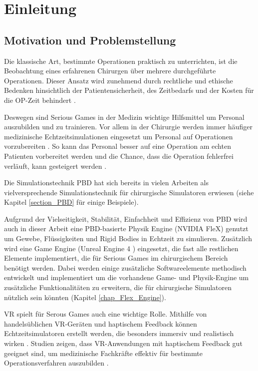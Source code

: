 \chapter{Einleitung}
\label{chap_Einleitung}



\section{Motivation und Problemstellung}


Die klassische Art, bestimmte Operationen praktisch zu unterrichten, ist die Beobachtung eines erfahrenen Chirurgen über mehrere durchgeführte Operationen. Dieser Ansatz wird zunehmend durch rechtliche und ethische Bedenken hinsichtlich der Patientensicherheit, des Zeitbedarfs und der Kosten für die OP-Zeit behindert \cite{SurgSim}.

Deswegen sind Serious Games in der Medizin wichtige Hilfsmittel um Personal auszubilden und zu trainieren. Vor allem in der Chirurgie werden immer häufiger medizinische Echtzeitsimulationen eingesetzt um Personal auf Operationen vorzubereiten \cite{SimRole}. So kann das Personal besser auf eine Operation am echten Patienten vorbereitet werden und die Chance, dass die Operation fehlerfrei verläuft, kann gesteigert werden \cite{VRNeuro}.

Die Simulationstechnik \ac{PBD} \cite{PBD} hat sich bereits in vielen Arbeiten als vielversprechende Simulationstechnik für chirurgische Simulatoren erwiesen (siehe Kapitel \ref{section_PBD} für einige Beispiele). 

Aufgrund der Vielseitigkeit, Stabilität, Einfachheit und Effizienz von PBD wird auch in dieser Arbeit eine PBD-basierte Physik Engine (NVIDIA FleX) genutzt um Gewebe, Flüssigkeiten und Rigid Bodies in Echtzeit zu simulieren. Zusätzlich wird eine Game Engine (Unreal Engine 4 \cite{UE4FlexDoc}) eingesetzt, die fast alle restlichen Elemente implementiert, die für Serious Games im chirurgischem Bereich benötigt werden. Dabei werden einige zusätzliche Softwareelemente methodisch entwickelt und implementiert um die vorhandene Game- und Physik-Engine um zusätzliche Funktionalitäten zu erweitern, die für chirurgische Simulatoren nützlich sein könnten (Kapitel \ref{chap_Flex_Engine}).

\ac{VR} spielt für Serous Games auch eine wichtige Rolle. 
Mithilfe von handelsüblichen VR-Geräten und haptischem Feedback können Echtzeitsimulatoren erstellt werden, die besonders immersiv und realistisch wirken \cite{VRSim20}. 
Studien zeigen, dass VR-Anwendungen mit haptischem Feedback gut geeignet sind, um medizinische Fachkräfte effektiv für bestimmte Operationsverfahren auszubilden  \cite{VRHapticSim}.


